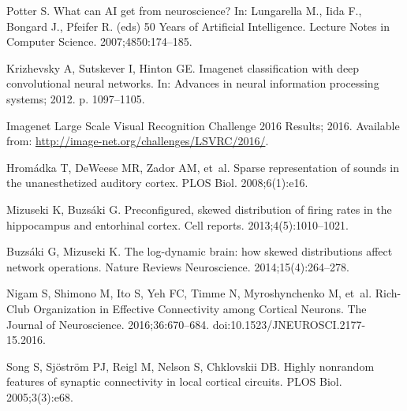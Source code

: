 \documentclass[10pt,letterpaper]{article}
\begin{document}

%
%
% 
%

\begin{thebibliography}{10}

Potter S.
\newblock What can AI get from neuroscience?
\newblock In: Lungarella M., Iida F., Bongard J., Pfeifer R. (eds) 
50 Years of Artificial Intelligence. Lecture Notes in Computer Science.
 2007;4850:174--185.

Krizhevsky A, Sutskever I, Hinton GE.
\newblock Imagenet classification with deep convolutional neural networks.
\newblock In: Advances in neural information processing systems; 2012. p.
  1097--1105.

Imagenet Large Scale Visual Recognition Challenge 2016 Results; 2016.
\newblock Available from: \url{http://image-net.org/challenges/LSVRC/2016/}.

Hrom{\'a}dka T, DeWeese MR, Zador AM, et~al.
\newblock Sparse representation of sounds in the unanesthetized auditory
  cortex.
\newblock PLOS Biol. 2008;6(1):e16.

Mizuseki K, Buzs{\'a}ki G.
\newblock Preconfigured, skewed distribution of firing rates in the hippocampus
  and entorhinal cortex.
\newblock Cell reports. 2013;4(5):1010--1021.

Buzs{\'a}ki G, Mizuseki K.
\newblock The log-dynamic brain: how skewed distributions affect network
  operations.
\newblock Nature Reviews Neuroscience. 2014;15(4):264--278.

Nigam S, Shimono M, Ito S, Yeh FC, Timme N, Myroshynchenko M, et~al.
\newblock Rich-Club Organization in Effective Connectivity among Cortical
  Neurons.
\newblock The Journal of Neuroscience. 2016;36:670--684.
\newblock doi:{10.1523/JNEUROSCI.2177-15.2016}.

Song S, Sj{\"o}str{\"o}m PJ, Reigl M, Nelson S, Chklovskii DB.
\newblock Highly nonrandom features of synaptic connectivity in local cortical
  circuits.
\newblock PLOS Biol. 2005;3(3):e68.


\end{thebibliography}
\end{document}
